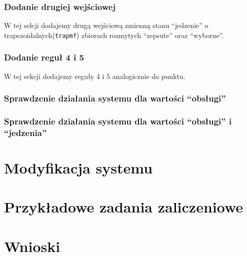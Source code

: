 \documentclass[a4paper, 10pt]{article}
\begin{document}
\subsubsection{Dodanie drugiej wejściowej}\label{p9}
 
W tej selcji dodajemy drugą wejściową zmienną stanu ``jedzenie'' o trapezoidalnych(\verb|trapmf|) zbiorach rozmytych ``zepsute'' oraz ``wyborne''.



\subsubsection{Dodanie reguł 4 i 5}\label{p10}

W tej sekcji dodajemy reguły 4 i 5 analogicznie do punktu.
\subsubsection{Sprawdzenie działania systemu dla wartości ``obsługi''}\label{p11}
\subsubsection{Sprawdzenie działania systemu dla wartości ``obsługi'' i ``jedzenia''}\label{p12}


\section{Modyfikacja systemu}\label{c2}

\section{Przykładowe zadania zaliczeniowe}\label{c3}

\section{Wnioski}
\end{document}
